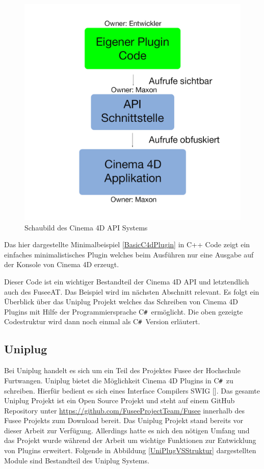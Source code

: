 \documentclass[pagesize, paper=a4, fontsize=12pt, titlepage=true, headings=small, headnosepline, abstractoff, liststotoc, nochapterprefix, plainheadsepline, twoside]{scrreprt}
\newcommand{\CSS}{C\texttt{\# }}
\begin{document}
\begin{figure}[ht]
	\centering
  \includegraphics[width=\linewidth]{Bilder/C4D_Api_Schaubild_v1.jpg}
	\caption{Schaubild des Cinema 4D API Systems}
	\label{C4D API Schaubild}
\end{figure}

Das hier dargestellte Minimalbeispiel \ref{BasicC4dPlugin} in C++ Code zeigt ein einfaches minimalistisches Plugin welches beim Ausführen nur eine Ausgabe auf der Konsole von Cinema 4D erzeugt.

\newpage

Dieser Code ist ein wichtiger Bestandteil der Cinema 4D API und letztendlich auch des FuseeAT. Das Beispiel wird im nächsten Abschnitt relevant. Es folgt ein Überblick über das Uniplug Projekt welches das Schreiben von Cinema 4D Plugins mit Hilfe der Programmiersprache \CSS ermöglicht. Die oben gezeigte  Codestruktur wird dann noch einmal als \CSS Version erläutert.

\subsection{Uniplug}
Bei Uniplug handelt es sich um ein Teil des Projektes Fusee der Hochschule Furtwangen. Uniplug bietet die Möglichkeit Cinema 4D Plugins in \CSS zu schreiben. Hierfür bedient es sich eines Interface Compilers SWIG []. Das gesamte Uniplug Projekt ist ein Open Source Projekt und steht auf einem GitHub Repository unter \url{https://github.com/FuseeProjectTeam/Fusee} innerhalb des Fusee Projekts zum Download bereit. Das Uniplug Projekt stand bereits vor dieser Arbeit zur Verfügung. Allerdings hatte es nich den nötigen Umfang und das Projekt wurde während der Arbeit um wichtige Funktionen zur Entwicklung von Plugins erweitert. Folgende in Abbildung \ref{UniPlugVSStruktur} dargestellten Module sind Bestandteil des Uniplug Systems.
\end{document}
